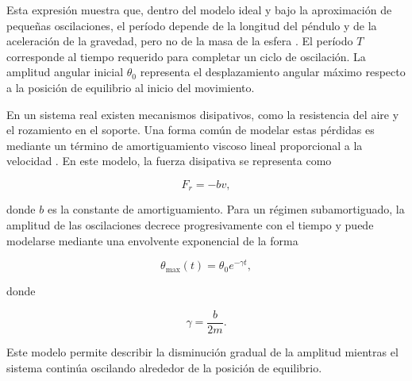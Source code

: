 Esta expresión muestra que, dentro del modelo ideal y bajo la aproximación de pequeñas oscilaciones, el período depende de la longitud del péndulo y de la aceleración de la gravedad, pero no de la masa de la esfera \cite{young2018}. El período $T$ corresponde al tiempo requerido para completar un ciclo de oscilación. La amplitud angular inicial $\theta_0$ representa el desplazamiento angular máximo respecto a la posición de equilibrio al inicio del movimiento.

En un sistema real existen mecanismos disipativos, como la resistencia del aire y el rozamiento en el soporte. Una forma común de modelar estas pérdidas es mediante un término de amortiguamiento viscoso lineal proporcional a la velocidad \cite{young2018}. En este modelo, la fuerza disipativa se representa como

\begin{equation}
F_r=-bv,
\label{eq:fuerza_disipativa}
\end{equation}

donde $b$ es la constante de amortiguamiento. Para un régimen subamortiguado, la amplitud de las oscilaciones decrece progresivamente con el tiempo y puede modelarse mediante una envolvente exponencial de la forma

\begin{equation}
\theta_{\max}(t)=\theta_0e^{-\gamma t},
\label{eq:envolvente_amortiguada}
\end{equation}

donde

\begin{equation}
\gamma=\frac{b}{2m}.
\label{eq:constante_atenuacion}
\end{equation}

Este modelo permite describir la disminución gradual de la amplitud mientras el sistema continúa oscilando alrededor de la posición de equilibrio.
